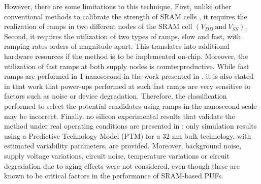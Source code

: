 However, there are some limitations to this technique. First, unlike other conventional methods to calibrate the strength of SRAM cells \cite{Bhargava2012,Baturone2015,Liu2017}, it requires the realization of ramps in two different nodes of the SRAM cell $(V_{DD} \ \mathrm{and} \ V_{SS} )$. Second, it requires the utilization of two types of ramps, slow and fast, with ramping rates orders of magnitude apart. This translates into additional hardware resources if the method is to be implemented on-chip. Moreover, the utilization of fast ramps at both supply nodes is counterproductive. While fast ramps are performed in 1 nanosecond in the work presented in \cite{Wang2018}, it is also stated in that work that power-ups performed at such fast ramps are very sensitive to factors such as noise or device degradation. Therefore, the classification performed to select the potential candidates using ramps in the nanosecond scale may be incorrect. Finally, no silicon experimental results that validate the method under real operating conditions are presented in \cite{Wang2018}: only simulation results using a Predictive Technology Model (PTM) for a 32-nm bulk technology, with estimated variability parameters, are provided. Moreover, background noise, supply voltage variations, circuit noise, temperature variations or circuit degradation due to aging effects were not considered, even though these are known to be critical factors in the performance of SRAM-based PUFs. 






